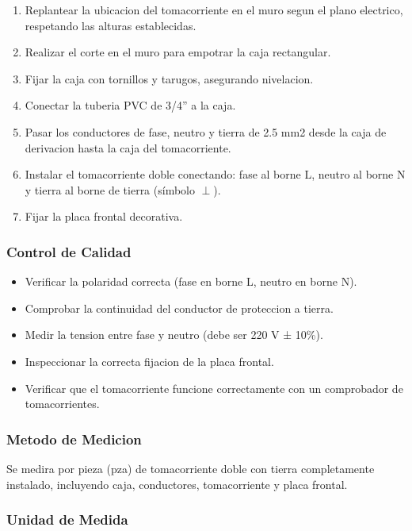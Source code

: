 \begin{enumerate}
  \item Replantear la ubicacion del tomacorriente en el muro segun el plano electrico, respetando las alturas establecidas.
  \item Realizar el corte en el muro para empotrar la caja rectangular.
  \item Fijar la caja con tornillos y tarugos, asegurando nivelacion.
  \item Conectar la tuberia PVC de 3/4'' a la caja.
  \item Pasar los conductores de fase, neutro y tierra de 2.5 mm2 desde la caja de derivacion hasta la caja del tomacorriente.
  \item Instalar el tomacorriente doble conectando: fase al borne L, neutro al borne N y tierra al borne de tierra (símbolo $\perp$).
  \item Fijar la placa frontal decorativa.
\end{enumerate}

\subsubsection{Control de Calidad}

\begin{itemize}
  \item Verificar la polaridad correcta (fase en borne L, neutro en borne N).
  \item Comprobar la continuidad del conductor de proteccion a tierra.
  \item Medir la tension entre fase y neutro (debe ser 220 V ± 10\%).
  \item Inspeccionar la correcta fijacion de la placa frontal.
  \item Verificar que el tomacorriente funcione correctamente con un comprobador de tomacorrientes.
\end{itemize}

\subsubsection{Metodo de Medicion}

Se medira por pieza (pza) de tomacorriente doble con tierra completamente instalado, incluyendo caja, conductores, tomacorriente y placa frontal.

\subsubsection{Unidad de Medida}

